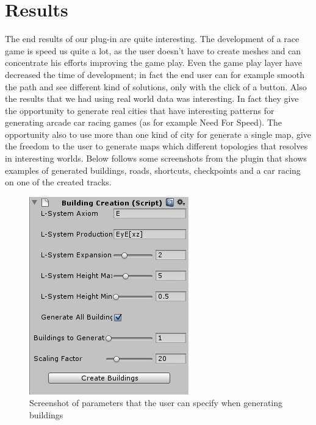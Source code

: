 \documentclass[conference]{IEEEtran}
\begin{document}
\section{Results}

The end results of our plug-in are quite interesting. The development of a race game is speed us quite a lot, as the user doesn't have to create meshes  and can  concentrate his efforts improving the game play. Even the game play layer have decreased the time of development; in fact the end user can for example smooth the path and see different kind of solutions, only with the click of a button.\newline
Also the results that we had using real world data was interesting.  In fact they give the opportunity to generate real cities that have interesting patterns for generating arcade car racing games (as for example Need For Speed). The opportunity also to use more than one kind of city for generate a single map, give the freedom to the user to generate maps which different topologies that resolves in interesting worlds. Below follows some screenshots from the plugin that shows examples of generated buildings, roads, shortcuts, checkpoints and a car racing on one of the created tracks.

\begin{figure}[h!t]
\centering
\includegraphics[scale=0.8]{images/BuildingScript.png}
\caption{\label{buildings} Screenshot of parameters that the user can specify when generating buildings}
\end{figure}
\end{document}
